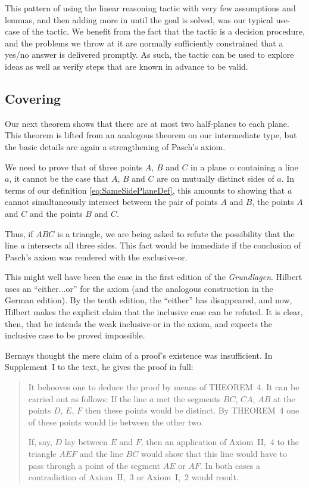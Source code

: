 This pattern of using the linear reasoning tactic with very few assumptions and lemmas, and then adding more in until the goal is solved, was our typical use-case of the tactic. We benefit from the fact that the tactic is a decision procedure, and the problems we throw at it are normally sufficiently constrained that a yes/no answer is delivered promptly. As such, the tactic can be used to explore ideas as well as verify steps that are known in advance to be valid.

\subsection{Covering}
Our next theorem shows that there are at most two half-planes to each plane. This theorem is lifted from an analogous theorem on our intermediate type, but the basic details are again a strengthening of Pasch's axiom.

We need to prove that of three points $A$, $B$ and $C$ in a plane $\alpha$ containing a line $a$, it cannot be the case that $A$, $B$ and $C$ are on mutually distinct sides of $a$. In terms of our definition \eqref{eq:SameSidePlaneDef}, this amounts to showing that $a$ cannot simultaneously intersect between the pair of points $A$ and $B$, the points $A$ and $C$ and the points $B$ and $C$. 

\label{sec:PaschInclusiveOr}Thus, if $ABC$ is a triangle, we are being asked to refute the possibility that the line $a$ intersects all three sides. This fact would be immediate if the conclusion of Pasch's axiom was rendered with the exclusive-or. 

This might well have been the case in the first edition of the \emph{Grundlagen}. Hilbert uses an ``either...or'' for the axiom (and the analogous construction in the German edition). By the tenth edition, the ``either'' has disappeared, and now, Hilbert makes the explicit claim that the inclusive case can be refuted. It is clear, then, that he intends the weak inclusive-or in the axiom, and expects the inclusive case to be proved impossible.

Bernays thought the mere claim of a proof's existence was insufficient. In Supplement~I to the text, he gives the proof in full:

\begin{quotation}\label{sec:SupplementI}
It behooves one to deduce the proof by means of THEOREM~4. It can be carried out as follows: If the line $a$ met the segments $BC$, $CA$, $AB$ at the points $D$, $E$, $F$ then these points would be distinct. By THEOREM~4 one of these points would lie between the other two.

If, say, $D$ lay between $E$ and $F$, then an application of Axiom~II,~4 to the triangle $AEF$ and the line $BC$ would show that this line would have to pass through a point of the segment $AE$ or $AF$. In both cases a contradiction of Axiom~II,~3 or Axiom~I,~2 would result.
\end{quotation}

